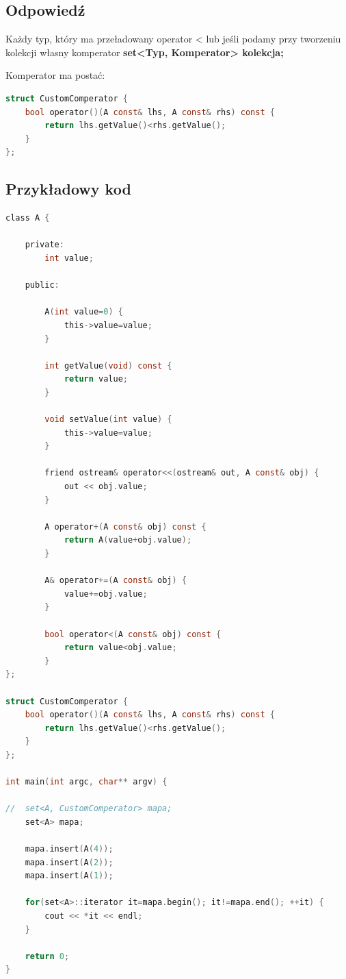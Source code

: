 \subsection{Odpowiedź}
Każdy typ, który ma przeładowany operator < lub jeśli podamy przy tworzeniu kolekcji własny komperator
\textbf{set<Typ, Komperator> kolekcja;}

Komperator ma postać:
\begin{lstlisting}[language=c]
struct CustomComperator {
	bool operator()(A const& lhs, A const& rhs) const {
		return lhs.getValue()<rhs.getValue();
	}
};
\end{lstlisting}

\subsection{Przykładowy kod}
\begin{lstlisting}[language=c]
class A {
	
	private:
		int value;
	
	public:
		
		A(int value=0) {
			this->value=value;
		}
		
		int getValue(void) const {
			return value;
		}
		
		void setValue(int value) {
			this->value=value;
		}
		
		friend ostream& operator<<(ostream& out, A const& obj) {
			out << obj.value;
		}
		
		A operator+(A const& obj) const {
			return A(value+obj.value);
		}
		
		A& operator+=(A const& obj) {
			value+=obj.value;
		}
		
		bool operator<(A const& obj) const {
			return value<obj.value;
		}
};

struct CustomComperator {
	bool operator()(A const& lhs, A const& rhs) const {
		return lhs.getValue()<rhs.getValue();
	}
};

int main(int argc, char** argv) {
	
//	set<A, CustomComperator> mapa;
	set<A> mapa;
	
	mapa.insert(A(4));
	mapa.insert(A(2));
	mapa.insert(A(1));
	
	for(set<A>::iterator it=mapa.begin(); it!=mapa.end(); ++it) {
		cout << *it << endl;
	}
	
	return 0;
}
\end{lstlisting}


